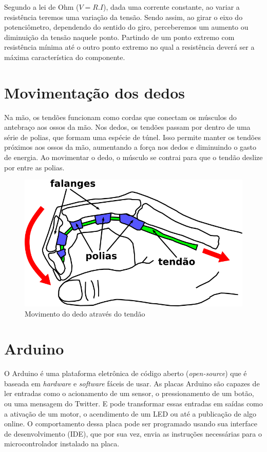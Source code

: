 \documentclass{ufpatcc}
\begin{document}
		Segundo a lei de Ohm ($V = R.I$), dada uma corrente constante, ao variar a resistência teremos uma variação da tensão. Sendo assim, ao girar o eixo do potenciômetro, dependendo do sentido do giro, perceberemos um aumento ou diminuição da tensão naquele ponto. Partindo de um ponto extremo com resistência mínima até o outro ponto extremo no qual a resistência deverá ser a máxima característica do componente.

		\section{Movimentação dos dedos}
		Na mão, os tendões funcionam como cordas que conectam os músculos do antebraço aos ossos da mão. Nos dedos, os tendões passam por dentro de uma série de polias, que formam uma espécie de túnel. Isso permite manter os tendões próximos aos ossos da mão, aumentando a força nos dedos e diminuindo o gasto de energia. Ao movimentar o dedo, o músculo se contrai para que o tendão deslize por entre as polias. \cite{drricardocirurgiao}
 
		\begin{figure}[h!]
  		\label{fig:hand-move1}
			\centering
  		\includegraphics[scale=0.5]{../pictures/hand-flex-movement1.png}
  		\caption{Movimento do dedo através do tendão}
		\end{figure}

		\section{Arduino}
		O Arduino é uma plataforma eletrônica de código aberto (\textit{open-source}) que é baseada em \textit{hardware} e \textit{software} fáceis de usar. As placas Arduino são capazes de ler entradas como o acionamento de um sensor, o pressionamento de um botão, ou uma mensagem do Twitter. E pode transformar essas entradas em saídas como a ativação de um motor, o acendimento de um LED ou até a publicação de algo online. O comportamento dessa placa pode ser programado usando sua interface de desenvolvimento (IDE), que por sua vez, envia as instruções necessárias para o microcontrolador instalado na placa.\cite{arduinosite}
		
\end{document}
